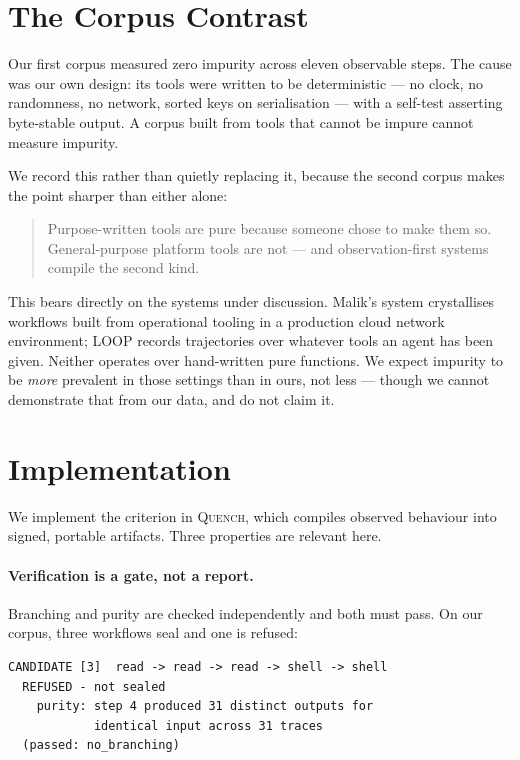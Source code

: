 \documentclass[10pt,conference]{article}
\newcommand{\quench}{\textsc{Quench}}
\begin{document}
\section{The Corpus Contrast}
\label{sec:contrast}

Our first corpus measured zero impurity across eleven observable steps. The
cause was our own design: its tools were written to be deterministic --- no
clock, no randomness, no network, sorted keys on serialisation --- with a
self-test asserting byte-stable output. A corpus built from tools that cannot be
impure cannot measure impurity.

We record this rather than quietly replacing it, because the second corpus makes
the point sharper than either alone:

\begin{quote}
Purpose-written tools are pure because someone chose to make them so.
General-purpose platform tools are not --- and observation-first systems compile
the second kind.
\end{quote}

This bears directly on the systems under discussion. Malik's system crystallises
workflows built from operational tooling in a production cloud network
environment; LOOP records trajectories over whatever tools an agent has been
given. Neither operates over hand-written pure functions. We expect impurity to
be \emph{more} prevalent in those settings than in ours, not less --- though we
cannot demonstrate that from our data, and do not claim it.

\section{Implementation}
\label{sec:impl}

We implement the criterion in \quench{}, which compiles observed behaviour into
signed, portable artifacts. Three properties are relevant here.

\paragraph{Verification is a gate, not a report.} Branching and purity are
checked independently and both must pass. On our corpus, three workflows seal
and one is refused:

\begin{lstlisting}
CANDIDATE [3]  read -> read -> read -> shell -> shell
  REFUSED - not sealed
    purity: step 4 produced 31 distinct outputs for
            identical input across 31 traces
  (passed: no_branching)
\end{lstlisting}
\end{document}
